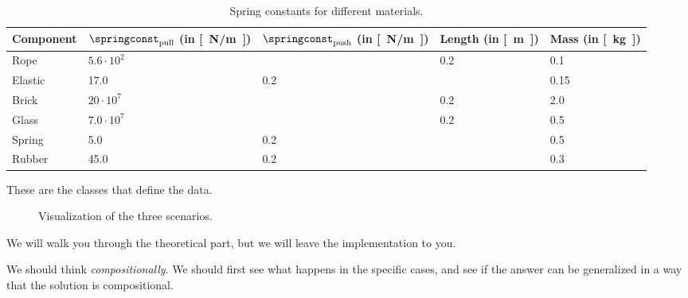 \begin{table}
  \begin{center}
\begin{tabular}{lllll}
  Component & $\springconst_\mathrm{pull}$ (in \unit[]{[N/m]})&$\springconst_\mathrm{push}$ (in \unit[]{[N/m]})& Length (in \unit[]{[m]})&Mass (in \unit[]{[kg]})\\
  \toprule
  Rope & $5.6\cdot 10^2$&&0.2&0.1 \\
  Elastic & 17.0&0.2&&0.15 \\
  Brick & $20\cdot 10^7$&&0.2&2.0\\
  Glass & $7.0\cdot 10^7$&&0.2&0.5\\
  Spring & 5.0&0.2&&0.5\\
  Rubber & 45.0&0.2&&0.3
\end{tabular}
  \caption{Spring constants for different materials.}
   \label{tab:spring_const}
\end{center}
\end{table}

These are the classes that define the data.



\begin{figure}
  \hfill
  \hfill
  \hfill
  \hfill
  \caption{Visualization of the three scenarios.}
\end{figure}


We will walk you through the theoretical part, but we will leave the implementation to you.

We should think \emph{compositionally}. We should first see what happens in the specific cases,
and see if the answer can be generalized in a way that the solution is compositional.